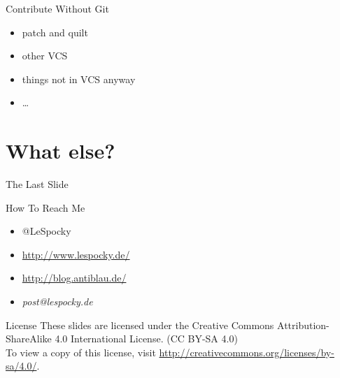 \documentclass{beamer}
\begin{document}
\begin{frame}{Contribute Without Git}
    \begin{itemize}
        \item patch and quilt
        \item other VCS
        \item things not in VCS anyway
        \item \dots
    \end{itemize}
\end{frame}

\section*{What else?}

\begin{frame}{The Last Slide}
    \begin{block}{How To Reach Me}
        \begin{itemize}
            \item @LeSpocky
            \item \url{http://www.lespocky.de/}
            \item \url{http://blog.antiblau.de/}
            \item \emph{post@lespocky.de}
        \end{itemize}
    \end{block}
    \begin{block}{License}
        These slides are licensed under the Creative Commons
        Attribution-ShareAlike 4.0 International License. (CC BY-SA 4.0) \\
        To view a copy of this license, visit
        \url{http://creativecommons.org/licenses/by-sa/4.0/}.
    \end{block}
\end{frame}
\end{document}
